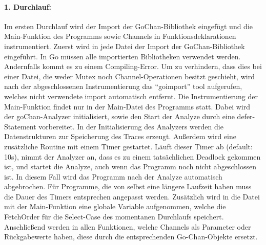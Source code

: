 \paragraph{1. Durchlauf:} Im ersten Durchlauf wird der Import der 
GoChan-Bibliothek eingefügt und die Main-Funktion des 
Programms sowie Channels in Funktionsdeklarationen instrumentiert.
Zuerst wird in jede Datei der Import der GoChan-Bibliothek eingeführt. In Go 
müssen alle importierten Bibliotheken verwendet werden. Andernfalls kommt es 
zu einem Compiling-Error. Um zu verhindern, dass dies bei einer Datei, die weder
Mutex noch Channel-Operationen besitzt geschieht, wird nach der abgeschlossenen 
Instrumentierung das ``goimport'' tool aufgerufen, welches nicht verwendete import 
automatisch entfernt. Die Instrumentierung der Main-Funktion findet nur 
in der Main-Datei des Programms statt. Dabei wird der goChan-Analyzer initialisiert,
sowie den Start der Analyze durch eine defer-Statement vorbereitet. In der 
Initialisierung des Analyzers werden die Datenstrukturen zur Speicherung 
des Traces erzeugt. Außerdem wird eine zusätzliche Routine mit einem 
Timer gestartet. Läuft dieser Timer ab (default: 10s), nimmt der Analyzer an, 
dass es zu einem tatsächlichen Deadlock gekommen ist, und startet die Analyze, 
auch wenn das Programm noch nicht abgeschlossen ist. In diesem Fall wird das 
Programm nach der Analyze automatisch abgebrochen. Für Programme, die von 
selbst eine längere Laufzeit haben muss die Dauer des Timers entsprechen 
angepasst werden. Zusätzlich wird in die Datei mit der Main-Funktion eine 
globale Variable aufgenommen, welche die FetchOrder für die Select-Case 
des momentanen Durchlaufs speichert. Anschließend werden in allen Funktionen, 
welche Channels als Parameter oder Rückgabewerte haben, diese durch die 
entsprechenden Go-Chan-Objekte ersetzt.
